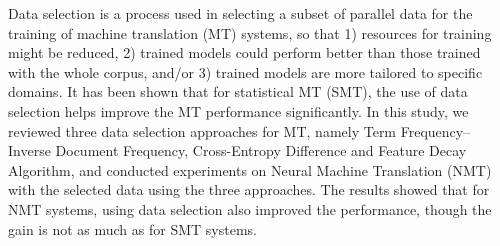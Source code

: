 Data selection is a process used in selecting a subset of parallel data for the training of machine translation (MT) systems, so that 1) resources for training might be reduced, 2) trained models could perform better than those trained with the whole corpus, and/or 3) trained models are more tailored to specific domains.  It has been shown that for statistical MT (SMT), the use of data selection helps improve the MT performance significantly.  In this study, we reviewed three data selection approaches for MT, namely Term Frequency--Inverse Document Frequency, Cross-Entropy Difference and Feature Decay Algorithm, and conducted experiments on Neural Machine Translation (NMT) with the selected data using the three approaches. The results showed that for NMT systems, using data selection also improved the performance, though the gain is not as much as for SMT systems.
